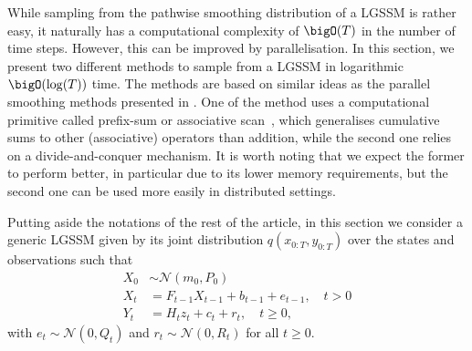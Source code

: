 While sampling from the pathwise smoothing distribution of a LGSSM is rather easy, it naturally has a computational complexity of $\bigO(T)$ in the number of time steps. However, this can be improved by parallelisation. In this section, we present two different methods to sample from a LGSSM in logarithmic $\bigO(\log(T))$ time. The methods are based on similar ideas as the parallel smoothing methods presented in \citet{Sarkka2021temporal}. One of the method uses a computational primitive called prefix-sum or associative scan~\citep{blelloch1989scans}, which generalises cumulative sums to other (associative) operators than addition, while the second one relies on a divide-and-conquer mechanism. It is worth noting that we expect the former to perform better, in particular due to its lower memory requirements, but the second one can be used more easily in distributed settings.

Putting aside the notations of the rest of the article, in this section we consider a generic LGSSM given by its joint distribution $q(x_{0:T}, y_{0:T})$ over the states and observations such that
\begin{equation}
    \label{eq:general-LGSSM}
    \begin{split}
        X_0 &\sim \mathcal{N}(m_0, P_0) \\
        X_t &= F_{t-1} X_{t-1} + b_{t-1} + e_{t-1}, \quad t > 0\\
        Y_t &= H_{t} z_{t} + c_{t} + r_{t}, \quad t \geq 0,
    \end{split}
\end{equation}
with $e_t \sim \mathcal{N}(0, Q_t)$ and $r_t \sim \mathcal{N}(0, R_t)$ for all $t \geq 0$.